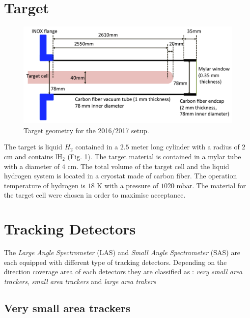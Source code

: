 \section{Target}

\begin{figure}[!h]
  \centering
	\includegraphics[scale=0.3]{./gfx/Target.png}
	\caption{Target geometry for the 2016/2017 setup.}
	\label{pic:Target}
\end{figure}

The target is liquid $H_2$ contained in a $2.5$ meter long cylinder with a radius of $2$ cm and contains lH$_2$ (Fig. \ref{pic:Target}). The target material is contained in a mylar tube with a diameter of $4$ cm. The total volume of the target cell and the liquid hydrogen system is located in a cryostat made of carbon fiber. The operation temperature of hydrogen is $18$ K with a pressure of $1020$ mbar. The material for the target cell were chosen in order to maximise acceptance.


\section{Tracking Detectors}\label{sec:track}

The \textit{Large Angle Spectrometer} (LAS) and \textit{Small Angle Spectrometer} (SAS) are each equipped with different type of tracking detectors. Depending on the direction coverage area of each detectors they are classified as :
\textit{very small area trackers}, \textit{small area trackers} and \textit{large area trakers}

\subsection{Very small area trackers}

